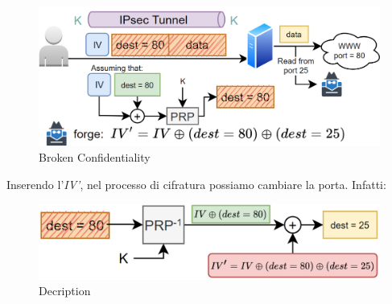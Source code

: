\begin{figure}[h]
    \centering
    \includegraphics[width=\linewidth]{image/portredirect.png}
    \caption{Broken Confidentiality}
    \label{fig:portredirect}
\end{figure}
Inserendo l'\textit{IV'}, nel processo di cifratura possiamo cambiare la porta. Infatti:
\begin{figure}[h]
    \centering
    \includegraphics[width=\linewidth]{image/portredirectdec.png}
    \caption{Decription}
    \label{fig:decriptionport}
\end{figure}
